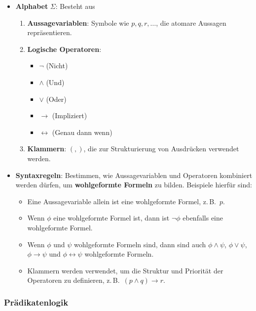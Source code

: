 \documentclass[main.tex]{subfiles}
\begin{document}
\begin{itemize}
    \item \textbf{Alphabet} \( \Sigma \): Besteht aus
    \begin{enumerate}
        \item \textbf{Aussagevariablen}: Symbole wie \( p, q, r, \ldots \), die atomare Aussagen repräsentieren.
        \item \textbf{Logische Operatoren}: 
        \begin{itemize}
            \item \( \neg \) (Nicht)
            \item \( \land \) (Und)
            \item \( \lor \) (Oder)
            \item \( \rightarrow \) (Impliziert)
            \item \( \leftrightarrow \) (Genau dann wenn)
        \end{itemize}
        \item \textbf{Klammern}: \( (, ) \), die zur Strukturierung von Ausdrücken verwendet werden.
    \end{enumerate}
    
    \item \textbf{Syntaxregeln}: Bestimmen, wie Aussagevariablen und Operatoren kombiniert werden dürfen, um \textbf{wohlgeformte Formeln} zu bilden. Beispiele hierfür sind:
    \begin{itemize}
        \item Eine Aussagevariable allein ist eine wohlgeformte Formel, z.\,B.\ \( p \).
        \item Wenn \( \phi \) eine wohlgeformte Formel ist, dann ist \( \neg \phi \) ebenfalls eine wohlgeformte Formel.
        \item Wenn \( \phi \) und \( \psi \) wohlgeformte Formeln sind, dann sind auch \( \phi \land \psi \), \( \phi \lor \psi \), \( \phi \rightarrow \psi \) und \( \phi \leftrightarrow \psi \) wohlgeformte Formeln.
        \item Klammern werden verwendet, um die Struktur und Priorität der Operatoren zu definieren, z.\,B.\ \( (p \land q) \rightarrow r \).
    \end{itemize}
\end{itemize}

\subsubsection{Prädikatenlogik}
\end{document}
